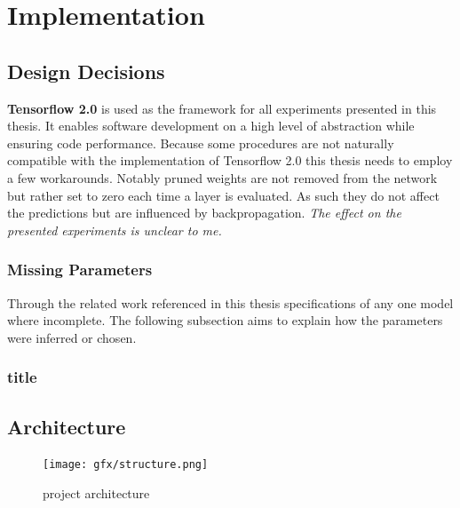 \chapter{Implementation}
\label{ch:implementation}

\section{Design Decisions}
\textbf{Tensorflow 2.0} is used as the framework for all experiments presented in this thesis. It enables software development on a high level of abstraction while ensuring code performance. Because some
procedures are not naturally compatible with the implementation of Tensorflow 2.0  this thesis needs to employ a few workarounds. Notably pruned weights are not removed from the network but rather set to zero each time a layer is evaluated. As such they do not affect the predictions but are influenced by backpropagation. \textit{The effect on the presented experiments is unclear to me.}

\subsection*{Missing Parameters}
Through the related work referenced in this thesis specifications of any one model where incomplete. The following subsection aims to explain how the parameters were inferred or chosen. 

\subsection{title}

\section{Architecture}
\begin{figure}[H]
	\centering
	\texttt{[image: gfx/structure.png]}
	\caption{project architecture}
	\label{fig:Architecture}
\end{figure}


